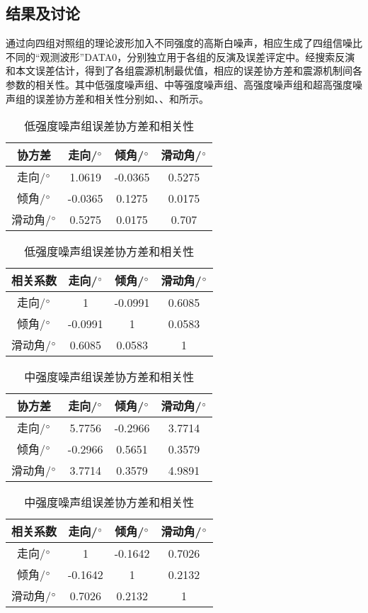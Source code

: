 \subsection{结果及讨论}
通过向四组对照组的理论波形加入不同强度的高斯白噪声，相应生成了四组信噪比不同的“观测波形”DATA0，分别独立用于各组的反演及误差评定中。经搜索反演和本文误差估计，得到了各组震源机制最优值，相应的误差协方差和震源机制间各参数的相关性。其中低强度噪声组、中等强度噪声组、高强度噪声组和超高强度噪声组的误差协方差和相关性分别如、、和所示。
\begin{table}[ht]
\centering
\caption{低强度噪声组误差协方差和相关性}
\label{tab3_02}
    \begin{tabular}{c c c c}
    \hline
    协方差 & 走向/$^\circ$ & 倾角/$^\circ$ & 滑动角/$^\circ$ \\
    \hline
	走向/$^\circ$ 		&1.0619 	&-0.0365	&0.5275\\
	倾角/$^\circ$		&-0.0365	&0.1275		&0.0175\\
	滑动角/$^\circ$	&0.5275		&0.0175		&0.707\\
    \hline
    \end{tabular}
    \begin{tabular}{c c c c}
    \hline
    相关系数 & 走向/$^\circ$ & 倾角/$^\circ$ & 滑动角/$^\circ$ \\
    \hline
	走向/$^\circ$ 		&1 			&-0.0991	&0.6085\\
	倾角/$^\circ$		&-0.0991	&1			&0.0583\\
	滑动角/$^\circ$	&0.6085		&0.0583		&1\\
    \hline
    \end{tabular}
\end{table}

\begin{table}[ht]
\centering
\caption{中强度噪声组误差协方差和相关性}
\label{tab3_03}
    \begin{tabular}{c c c c}
    \hline
    协方差 & 走向/$^\circ$ & 倾角/$^\circ$ & 滑动角/$^\circ$ \\
    \hline
	走向/$^\circ$ 		&5.7756 	&-0.2966	&3.7714\\
	倾角/$^\circ$		&-0.2966	&0.5651		&0.3579\\
	滑动角/$^\circ$	&3.7714		&0.3579		&4.9891\\
    \hline
    \end{tabular}
    \begin{tabular}{c c c c}
    \hline
    相关系数 & 走向/$^\circ$ & 倾角/$^\circ$ & 滑动角/$^\circ$ \\
    \hline
	走向/$^\circ$ 		&1 			&-0.1642	&0.7026\\
	倾角/$^\circ$		&-0.1642	&1			&0.2132\\
	滑动角/$^\circ$	&0.7026		&0.2132		&1\\
    \hline
    \end{tabular}
\end{table}

